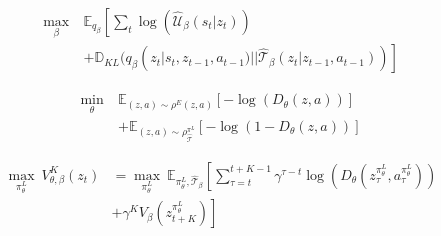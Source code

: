 \begin{align}
    \label{formula:elbo}
    \underset{\beta}{\max} \ & \mathbb{E}_{q_{\beta}} \left[ \sum_{t} \log(\mathcal{\hat{U}}_{\beta}(s_{t}|z_{t})) \right. \nonumber \\
    &\left. + \mathbb{D}_{KL}(q_{\beta}(z_{t}|s_{t},z_{t-1},a_{t-1})|| \mathcal{\hat{T}}_{\beta}(z_{t}|z_{t-1},a_{t-1})) \right]
\end{align}

\begin{align}
    \label{formula:discriminator}
    \underset{\theta}{\min} \ & \mathbb{E}_{(z,a) \sim \rho^{E}(z,a)} \left[ -\log(D_{\theta}(z,a)) \right] \nonumber \\
    & + \mathbb{E}_{(z,a) \sim \rho^{\pi^{L}}_{\hat{\mathcal{T}}}} \left[ -\log(1 - D_{\theta}(z,a)) \right]
\end{align}

\begin{align}
    \label{formula:value_function}
    \underset{\pi^{L}_{\theta}}{\max} \ V^{K}_{\theta,\beta}(z_{t}) 
    &= \underset{\pi^{L}_{\theta}}{\max} \ \mathbb{E}_{\pi^{L}_{\theta}, \mathcal{\hat{T}}_{\beta}} \left[ \sum_{\tau = t}^{t+K-1} \gamma^{\tau-t} \log(D_{\theta}(z_{\tau}^{\pi^{L}_{\theta}}, a_{\tau}^{\pi^{L}_{\theta}})) \right. \nonumber \\
    &\left. + \gamma^{K}V_{\beta}(z_{t+K}^{\pi^{L}_{\theta}}) \right]
\end{align}

    